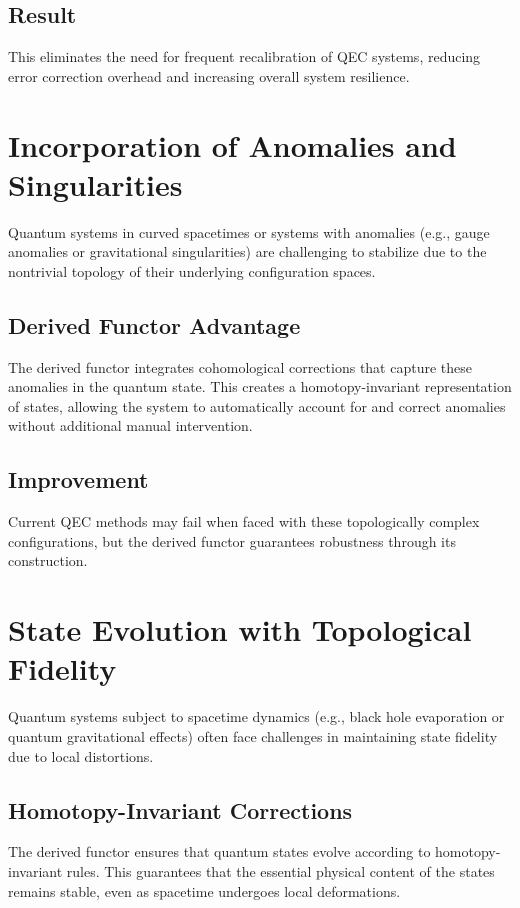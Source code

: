 \documentclass[11pt]{article}
\begin{document}
\subsection{Result}
This eliminates the need for frequent recalibration of QEC systems, reducing error correction overhead and increasing overall system resilience.

\section{Incorporation of Anomalies and Singularities}
Quantum systems in curved spacetimes or systems with anomalies (e.g., gauge anomalies or gravitational singularities) are challenging to stabilize due to the nontrivial topology of their underlying configuration spaces.

\subsection{Derived Functor Advantage}
The derived functor integrates cohomological corrections that capture these anomalies in the quantum state. This creates a homotopy-invariant representation of states, allowing the system to automatically account for and correct anomalies without additional manual intervention.

\subsection{Improvement}
Current QEC methods may fail when faced with these topologically complex configurations, but the derived functor guarantees robustness through its construction.

\section{State Evolution with Topological Fidelity}
Quantum systems subject to spacetime dynamics (e.g., black hole evaporation or quantum gravitational effects) often face challenges in maintaining state fidelity due to local distortions.

\subsection{Homotopy-Invariant Corrections}
The derived functor ensures that quantum states evolve according to homotopy-invariant rules. This guarantees that the essential physical content of the states remains stable, even as spacetime undergoes local deformations.
\end{document}
